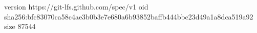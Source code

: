 version https://git-lfs.github.com/spec/v1
oid sha256:bfc83070ca58c4ae3b0b3e7e680a6b93852baffb444bbc23d49a1a8dca519a92
size 87544
